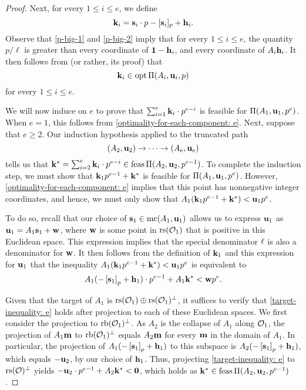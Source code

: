 \documentclass[11pt]{amsart}
\begin{document}
\begin{proof}
Next, for every $1 \leq i \leq e$,  we define
  \[
\mathbf{k}_i = \mathbf{s}_i \cdot p - [\mathbf{s}_i]_p + \mathbf{h}_i.
\]
Observe that \eqref{p-big-1} and \eqref{p-big-2} imply that for every $1 \leq i \leq e$, the quantity $p/\ell$ is greater than every coordinate of $\mathbf{1}-\mathbf{h}_i$, and every coordinate of $A_i \mathbf{h}_i$.  It then follows from  (or rather, its proof) that 
\begin{equation}
\label{optimality-for-each-component: e}
\mathbf{k}_i \in \operatorname{opt} \Pi(A_i, \mathbf{u}_i,p)
\end{equation}
for every $1 \leq i \leq e$.

We will now induce on $e$ to prove that $\sum_{i=1}^e \mathbf{k}_i \cdot p^{e-i}$ is feasible for $\Pi(A_1, \mathbf{u}_1, p^e)$.  When $e = 1$, this follows from \eqref{optimality-for-each-component: e}.  Next, suppose that $e \geq 2$.  Our induction hypothesis applied to the truncated path  
\[ (A_2, \mathbf{u}_2) \to \cdots \to (A_e, \mathbf{u}_e) \]
%
tells us that $\mathbf{k}^{\ast} = \sum_{i=2}^e \mathbf{k}_i \cdot p^{e-i} \in \operatorname{feas} \Pi(A_2, \mathbf{u}_2, p^{e-1})$.  To complete the induction step, we must show that $\mathbf{k}_1 p^{e-1} + \mathbf{k}^{\ast}$ is feasible for $\Pi(A_1, \mathbf{u}_1, p^e)$.  However,  \eqref{optimality-for-each-component: e} implies that this point has nonnegative integer coordinates, and hence, we must only show that $A_1 ( \mathbf{k}_1 p^{e-1} + \mathbf{k}^{\ast} ) < \mathbf{u}_1 p^e$.

To do so,  recall that our choice of $\mathbf{s}_1 \in \operatorname{mc}(A_1, \mathbf{u}_1)$ allows us to express $\mathbf{u}_1$ as 
$\mathbf{u}_1 = A_1 \mathbf{s}_1 + \mathbf{w}$, where $\mathbf{w}$ is some point in $\operatorname{rs}(\mathcal{O}_1)$ that is positive in this Euclidean space.  This expression implies that the special denominator $\ell$ is also a denominator for $\mathbf{w}$.  It then follows from the definition of $\mathbf{k}_1$ and this expression for $\mathbf{u}_1$ that the inequality $A_1 ( \mathbf{k}_1 p^{e-1} + \mathbf{k}^{\ast} ) < \mathbf{u}_1 p^e$ is equivalent to 
%
\begin{equation}
\label{target-inequality: e}
  A_1( - \left[ \mathbf{s}_1 \right]_p + \mathbf{h}_1 ) \cdot p^{e-1} + A_1\mathbf{k}^{\ast} < \mathbf{w} p^e.
\end{equation}

Given that the target of $A_1$ is $\operatorname{rs}(\mathcal{O}_1) \oplus \operatorname{rs}(\mathcal{O}_1)^{\perp}$, it suffices to verify that \eqref{target-inequality: e} holds after projection to each of these Euclidean spaces.  We first consider the projection to $\operatorname{rb}(\mathcal{O}_1)^{\perp}$.  As $A_2$ is the collapse of $A_1$ along $\mathcal{O}_1$, the projection of $A_1 \mathbf{m}$ to $\operatorname{rb}(\mathcal{O}_1)^{\perp}$ equals $A_2 \mathbf{m}$ for every $\mathbf{m}$ in the domain of $A_1$.  In particular, the projection of $A_1( - \left[ \mathbf{s}_1 \right]_p + \mathbf{h}_1 )$ to this subspace is $A_2 ( - \left[ \mathbf{s}_1 \right]_p + \mathbf{h}_1 )$, which equals $-\mathbf{u}_2$, by our choice of $\mathbf{h}_1$.  Thus, projecting \eqref{target-inequality: e} to $\operatorname{rs}(\mathcal{O})^{\perp}$ yields $-\mathbf{u}_2 \cdot p^{e-1} + A_2 \mathbf{k}^{\ast} < \mathbf{0}$, which holds as $\mathbf{k}^{\ast} \in \operatorname{feas} \Pi(A_2, \mathbf{u}_2, p^{e-1})$.


\end{proof}
\end{document}
